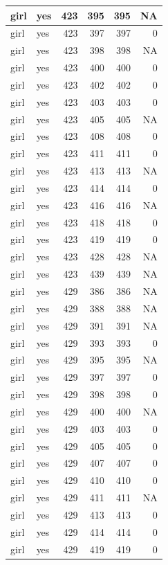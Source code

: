 \documentclass[man]{apa6}
\begin{document}
\begin{tabular}{l|l|r|r|r|r}
\hline
girl & yes & 423 & 395 & 395 & NA\\
\hline
girl & yes & 423 & 397 & 397 & 0\\
\hline
girl & yes & 423 & 398 & 398 & NA\\
\hline
girl & yes & 423 & 400 & 400 & 0\\
\hline
girl & yes & 423 & 402 & 402 & 0\\
\hline
girl & yes & 423 & 403 & 403 & 0\\
\hline
girl & yes & 423 & 405 & 405 & NA\\
\hline
girl & yes & 423 & 408 & 408 & 0\\
\hline
girl & yes & 423 & 411 & 411 & 0\\
\hline
girl & yes & 423 & 413 & 413 & NA\\
\hline
girl & yes & 423 & 414 & 414 & 0\\
\hline
girl & yes & 423 & 416 & 416 & NA\\
\hline
girl & yes & 423 & 418 & 418 & 0\\
\hline
girl & yes & 423 & 419 & 419 & 0\\
\hline
girl & yes & 423 & 428 & 428 & NA\\
\hline
girl & yes & 423 & 439 & 439 & NA\\
\hline
girl & yes & 429 & 386 & 386 & NA\\
\hline
girl & yes & 429 & 388 & 388 & NA\\
\hline
girl & yes & 429 & 391 & 391 & NA\\
\hline
girl & yes & 429 & 393 & 393 & 0\\
\hline
girl & yes & 429 & 395 & 395 & NA\\
\hline
girl & yes & 429 & 397 & 397 & 0\\
\hline
girl & yes & 429 & 398 & 398 & 0\\
\hline
girl & yes & 429 & 400 & 400 & NA\\
\hline
girl & yes & 429 & 403 & 403 & 0\\
\hline
girl & yes & 429 & 405 & 405 & 0\\
\hline
girl & yes & 429 & 407 & 407 & 0\\
\hline
girl & yes & 429 & 410 & 410 & 0\\
\hline
girl & yes & 429 & 411 & 411 & NA\\
\hline
girl & yes & 429 & 413 & 413 & 0\\
\hline
girl & yes & 429 & 414 & 414 & 0\\
\hline
girl & yes & 429 & 419 & 419 & 0\\

\end{tabular}
\end{document}

